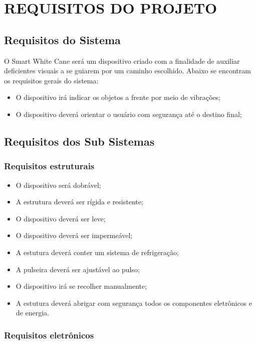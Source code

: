 \chapter[Requisitos do projeto]{REQUISITOS DO PROJETO}

\section{Requisitos do Sistema}

O Smart White Cane será um dispositivo criado com a finalidade de auxiliar deficientes visuais a se guiarem por um caminho escolhido. Abaixo se encontram os requisitos gerais do sistema:

\begin{itemize}
\item O dispositivo irá indicar os objetos a frente por meio de vibrações;
\item O dispositivo deverá orientar o usuário com segurança até o destino final;
\end{itemize}

\section{Requisitos dos Sub Sistemas}

\subsection{Requisitos estruturais}

\begin{itemize}
\item O dispositivo será dobrável; 
\item A estrutura deverá ser rígida e resistente;
\item O dispositivo deverá ser leve;
\item O dispositivo deverá ser impermeável;
\item A estutura deverá conter um sistema de refrigeração; 
\item A pulseira deverá ser ajustável ao pulso;
\item O dispositivo irá se recolher manualmente;
\item A estutura deverá abrigar com segurança todos os componentes eletrônicos e de energia.
\end{itemize}

\subsection{Requisitos eletrônicos}

